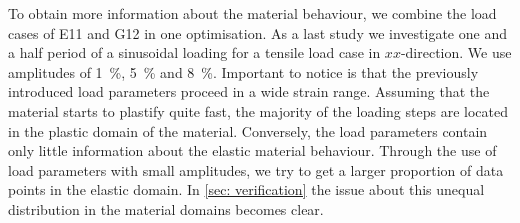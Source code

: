 To obtain more information about the material behaviour, we combine the load cases of E11 and G12 in one optimisation. 
As a last study we investigate one and a half period of a sinusoidal loading for a tensile load case in $xx$-direction. We use amplitudes of 1 \%, 5 \% and 8 \%. Important to notice is that the previously introduced load parameters proceed in a wide strain range. Assuming that the material starts to plastify quite fast, the majority of the loading steps are located in the plastic domain of the material. Conversely, the load parameters contain only little information about the elastic material behaviour. 
Through the use of load parameters with small amplitudes, we try to get a larger proportion of data points in the elastic domain.
In \autoref{sec: verification} the issue about this unequal distribution in the material domains becomes clear.    

